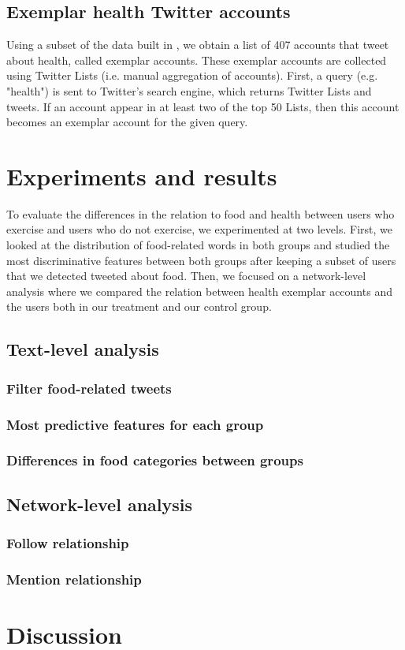 \documentclass[letterpaper]{article}
\newcommand{\cut}[1]{}
\begin{document}
\subsection{Exemplar health Twitter accounts}

Using a subset of the data built in \cite{culotta2016mining}, we obtain a list
of 407 accounts that tweet about health, called exemplar accounts. These
exemplar accounts are collected using Twitter Lists (i.e. manual aggregation of
accounts). First, a query (e.g. "health") is sent to Twitter's search engine,
which returns Twitter Lists and tweets. If an account appear in at least two of
the top 50 Lists, then this account becomes an exemplar account for the given
query.

\section{Experiments and results}

To evaluate the differences in the relation to food and health between users who exercise and users who do not exercise, we experimented at two levels. First, we looked at the distribution of food-related words in both groups and studied the most discriminative features between both groups after keeping a subset of users that we detected tweeted about food. Then, we focused on a network-level analysis where we compared the relation between health exemplar accounts and the users both in our treatment and our control group.

\cut{
  - wordnet filter is subject to high false positive rate (e.g. must, cat, dog)
}

\subsection{Text-level analysis}

\subsubsection{Filter food-related tweets}

\subsubsection{Most predictive features for each group}

\subsubsection{Differences in food categories between groups}


\subsection{Network-level analysis}

\subsubsection{Follow relationship}

\subsubsection{Mention relationship}

\section{Discussion}



\end{document}
